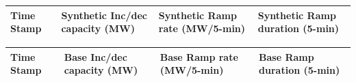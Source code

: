 \begin{table}[h]
        \begin{minipage}[t]{0.45\textwidth}
            \centering
        \small
            \begin{tabular}{|p{1.8cm}|C{1.5cm}|C{1.5cm}|C{1.5cm}|}\hline
            Time Stamp & Synthetic Inc/dec capacity (MW) & Synthetic Ramp rate (MW/5-min) & Synthetic Ramp duration (5-min) \\
            \hline
            \end{tabular}
   \end{minipage}\hfill%
    \begin{minipage}[t]{0.45\textwidth}
        \centering
\small
    \begin{tabular}{|p{1.8cm}|C{1.5cm}|C{1.5cm}|C{1.5cm}|}\hline
       Time Stamp & Base Inc/dec capacity (MW) & Base Ramp rate (MW/5-min) & Base Ramp duration (5-min) \\
       \hline
        \end{tabular}\label{tab:swingdoor-mag_ramp}
     \end{minipage}
    \end{table}